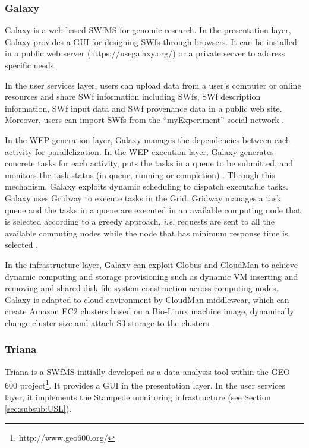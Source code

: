 \subsubsection{Galaxy}
Galaxy is a web-based SWfMS for genomic research. 
In the presentation layer, Galaxy provides a GUI for designing SWfs through browsers. 
It can be installed in a public web server (https://usegalaxy.org/) or a private server to address specific needs. 

In the user services layer, users can upload data from a user's computer or online resources and share SWf information including SWfs, SWf description information, SWf input data and SWf provenance data in a public web site. 
Moreover, users can import SWfs from the \textquotedblleft{}myExperiment\textquotedblright{}
\cite{Wolstencroft2013} social network \cite{Goecks2012}. 

In the WEP generation layer, Galaxy manages the dependencies between each activity for parallelization. 
In the WEP execution layer, Galaxy generates concrete tasks for each activity, 
puts the tasks in a queue to be submitted, and monitors the task status (in queue, running or completion) \cite{Karuna2012}. 
Through this mechanism, Galaxy exploits dynamic scheduling to dispatch executable tasks.
Galaxy uses Gridway to execute tasks in the Grid. 
Gridway manages a task queue and the tasks in a queue are executed in
an available computing node that is selected according to a greedy
approach, \textit{i.e.} requests are sent to all the available computing nodes while the node that has minimum response time is selected \cite{Huedo2004}. 

In the infrastructure layer, Galaxy can exploit Globus \cite{Liu2012} and CloudMan \cite{Afgan2010} to achieve dynamic computing and storage provisioning such as dynamic VM inserting and removing and shared-disk file system construction across computing nodes. Galaxy is adapted to cloud environment by CloudMan \cite{Afgan2010} middlewear, which can create Amazon EC$2$ clusters based on a Bio-Linux machine image, dynamically change cluster size and attach S$3$ storage to the clusters. 

\subsubsection{Triana}
Triana \cite{Taylor2007} is a SWfMS initially developed as a data
analysis tool within the GEO $600$ 
project\footnote{http://www.geo600.org/}. It provides a GUI in the presentation 
layer. In the user services layer, it implements the Stampede monitoring 
infrastructure \cite{Vahi2012} (see Section \ref{sec:subsub:USL}).
 
